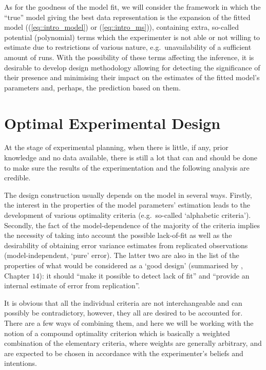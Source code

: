 As for the goodness of the model fit, we will consider the framework in which the ``true'' model giving the best data representation is the expansion of the fitted model ((\ref{eq::intro_model}) or (\ref{eq::intro_ms})), containing extra, so-called potential (polynomial) terms which the experimenter is not able or not willing to estimate due to restrictions of various nature, e.g.~unavailability of a sufficient amount of runs. With the possibility of these terms affecting the inference, it is desirable to develop design methodology allowing for detecting the significance of their presence and minimising their impact on the estimates of the fitted model's parameters and, perhaps, the prediction based on them. 

\section{Optimal Experimental Design}

At the stage of experimental planning, when there is little, if any, prior knowledge and no data available, there is still a lot that can and should be done to make sure the results of the experimentation and the following analysis are credible.

The design construction usually depends on the model in several ways. Firstly, the interest in the properties of the model parameters' estimation leads to the development of various optimality criteria (e.g.~so-called `alphabetic criteria'). Secondly, the fact of the model-dependence of the majority of the criteria implies the necessity of taking into account the possible lack-of-fit as well as the desirability of obtaining error variance estimates from replicated observations (model-independent, `pure' error). The latter two are also in the list of the properties of what would be considered as a `good design' (summarised by \cite{Box1987empirical}, Chapter $14$): it should ``make it possible to detect lack of fit'' and ``provide an internal estimate of error from replication''.

It is obvious that all the individual criteria are not interchangeable and can possibly be contradictory, however, they all are desired to be accounted for. There are a few ways of combining them, and here we will be working with the notion of a compound optimality criterion which is basically a weighted combination of the elementary criteria, where weights are generally arbitrary, and are expected to be chosen in accordance with the experimenter's beliefs and intentions. 

